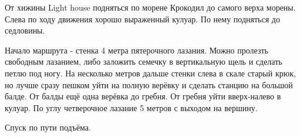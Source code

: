 От хижины Light house подняться по морене Крокодил до самого верха
морены. Слева по ходу движения хорошо выраженный кулуар. По нему
подняться до седловины.

Начало маршрута - стенка 4 метра пятерочного лазания. Можно пролезть
свободным лазанием, либо заложить семечку в вертикальную щель и
сделать петлю под ногу. На несколько метров дальше стенки слева в
скале старый крюк, но лучше сразу пешком уйти на полную верёвку и
сделать станцию на большой балде. От балды ещё одна верёвка до гребня.
От гребня уйти вверх-налево в кулуар. По углу четверочное лазание 5
метров с выходом на вершину.

Спуск по пути подъёма.
